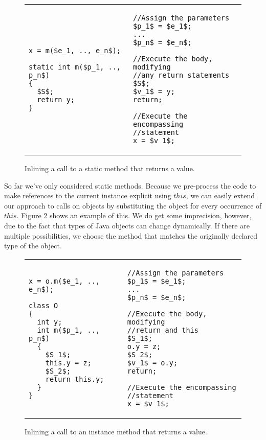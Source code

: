 \documentclass[a4paper, fleqn]{article}
\begin{document}
\begin{figure}[H]
\begin{tabular}{ p{5.5cm} | p{5cm}}
\begin{lstlisting}
x = m($e_1, .., e_n$);

static int m($p_1, .., p_n$)
{
  $S$;
  return y;
}
\end{lstlisting}
&
\begin{lstlisting}
//Assign the parameters
$p_1$ = $e_1$;
...
$p_n$ = $e_n$;

//Execute the body, modifying
//any return statements
$S$;
$v_1$ = y;
return;

//Execute the encompassing 
//statement
x = $v_1$;
\end{lstlisting}
\end{tabular}\caption{Inlining a call to a static method that returns a value.}
\label{non-void method call}
\end{figure}

So far we've only considered static methods. Because we pre-process the code to make references to the current instance explicit using $this$, we can easily extend our approach to calls on objects by substituting the object for every occurrence of $this$. Figure \ref{instance method call} shows an example of this. We do get some imprecision, however, due to the fact that types of Java objects can change dynamically. If there are multiple possibilities, we choose the method that matches the originally declared type of the object.

\begin{figure}[H]
\begin{tabular}{ p{5.5cm} | p{5cm}}
\begin{lstlisting}
x = o.m($e_1, .., e_n$);

class O
{
  int y;
  int m($p_1, .., p_n$)
  {
    $S_1$;
    this.y = z;
    $S_2$;
    return this.y;
  }
}
\end{lstlisting}
&
\begin{lstlisting}
//Assign the parameters
$p_1$ = $e_1$;
...
$p_n$ = $e_n$;

//Execute the body, modifying
//return and this
$S_1$;
o.y = z;
$S_2$;
$v_1$ = o.y;
return;

//Execute the encompassing 
//statement
x = $v_1$;
\end{lstlisting}
\end{tabular}\caption{Inlining a call to an instance method that returns a value.}
\label{instance method call}
\end{figure}
\end{document}
